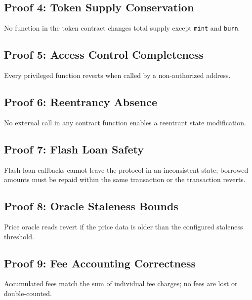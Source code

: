 \subsection{Proof 4: Token Supply Conservation}

No function in the token contract changes total supply except \texttt{mint} and
\texttt{burn}.

\subsection{Proof 5: Access Control Completeness}

Every privileged function reverts when called by a non-authorized address.

\subsection{Proof 6: Reentrancy Absence}

No external call in any contract function enables a reentrant state modification.

\subsection{Proof 7: Flash Loan Safety}

Flash loan callbacks cannot leave the protocol in an inconsistent state; borrowed
amounts must be repaid within the same transaction or the transaction reverts.

\subsection{Proof 8: Oracle Staleness Bounds}

Price oracle reads revert if the price data is older than the configured staleness
threshold.

\subsection{Proof 9: Fee Accounting Correctness}

Accumulated fees match the sum of individual fee charges; no fees are lost or
double-counted.

